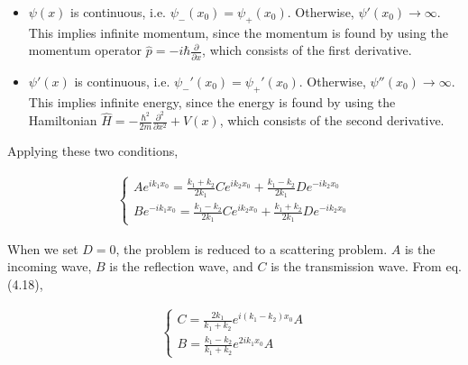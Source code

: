 \documentclass[12pt]{book} %
\numberwithin{equation}{chapter}
\def\p{\partial}
\begin{document}
\begin{itembox}
\begin{itemize}
    \item $\psi(x)$ is continuous, i.e. $\psi_{-}(x_{0})=\psi_{+}(x_{0})$. Otherwise,  $\psi'(x_{0})\to\infty$. This implies infinite momentum, since the momentum is found by using the momentum operator $\hat{p}=-i\hbar\frac{\p}{\p x}$, which consists of the first derivative.
    \item $\psi'(x)$ is continuous, i.e. $\psi_{-}'(x_{0})=\psi_{+}'(x_{0})$. Otherwise,  $\psi''(x_{0})\to\infty$. This implies infinite energy, since the energy is found by using the Hamiltonian $\hat{H}=-\frac{\hbar^{2}}{2m}\frac{\p^{2}}{\p x^{2}}+V(x)$, which consists of the second derivative.
\end{itemize}
\end{itembox}
Applying these two conditions,
\begin{eqnbox}
\begin{align}
\begin{cases}
Ae^{ik_{1}x_{0}}=\frac{k_{1}+k_{2}}{2k_{1}}Ce^{ik_{2}x_{0}}+\frac{k_{1}-k_{2}}{2k_{1}}De^{-ik_{2}x_{0}}\\
Be^{-ik_{1}x_{0}}=\frac{k_{1}-k_{2}}{2k_{1}}Ce^{ik_{2}x_{0}}+\frac{k_{1}+k_{2}}{2k_{1}}De^{-ik_{2}x_{0}}
\end{cases}
\end{align}
\end{eqnbox}
When we set $D=0$, the problem is reduced to a scattering problem. $A$ is the incoming wave, $B$ is the reflection wave, and $C$ is the transmission wave. From eq. (4.18),
\begin{eqnbox}\begin{align}
\begin{cases}
C=\frac{2k_{1}}{k_{1}+k_{2}}e^{i\left(k_{1}-k_{2}\right)x_{0}}A\\
B=\frac{k_{1}-k_{2}}{k_{1}+k_{2}}e^{2ik_{1}x_{0}}A
\end{cases}
\end{align}\end{eqnbox}
\end{document}

